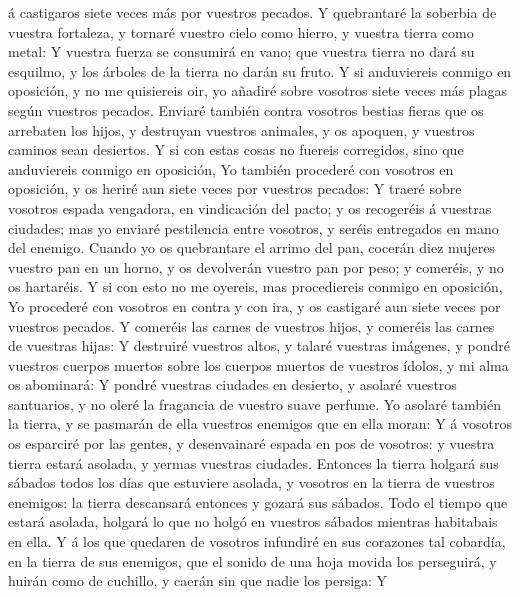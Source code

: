 á castigaros siete veces más por vuestros pecados.  Y
quebrantaré la soberbia de vuestra fortaleza, y tornaré vuestro cielo
como hierro, y vuestra tierra como metal:  Y vuestra fuerza
se consumirá en vano; que vuestra tierra no dará su esquilmo, y los
árboles de la tierra no darán su fruto.  Y si anduviereis
conmigo en oposición, y no me quisiereis oir, yo añadiré sobre vosotros
siete veces más plagas según vuestros pecados.  Enviaré
también contra vosotros bestias fieras que os arrebaten los hijos, y
destruyan vuestros animales, y os apoquen, y vuestros caminos sean
desiertos.  Y si con estas cosas no fuereis corregidos,
sino que anduviereis conmigo en oposición,  Yo también
procederé con vosotros en oposición, y os heriré aun siete veces por
vuestros pecados:  Y traeré sobre vosotros espada
vengadora, en vindicación del pacto; y os recogeréis á vuestras
ciudades; mas yo enviaré pestilencia entre vosotros, y seréis entregados
en mano del enemigo.  Cuando yo os quebrantare el arrimo
del pan, cocerán diez mujeres vuestro pan en un horno, y os devolverán
vuestro pan por peso; y comeréis, y no os hartaréis.  Y si
con esto no me oyereis, mas procediereis conmigo en oposición,
 Yo procederé con vosotros en contra y con ira, y os
castigaré aun siete veces por vuestros pecados.  Y comeréis
las carnes de vuestros hijos, y comeréis las carnes de vuestras hijas:
 Y destruiré vuestros altos, y talaré vuestras imágenes, y
pondré vuestros cuerpos muertos sobre los cuerpos muertos de vuestros
ídolos, y mi alma os abominará:  Y pondré vuestras ciudades
en desierto, y asolaré vuestros santuarios, y no oleré la fragancia de
vuestro suave perfume.  Yo asolaré también la tierra, y se
pasmarán de ella vuestros enemigos que en ella moran:  Y á
vosotros os esparciré por las gentes, y desenvainaré espada en pos de
vosotros: y vuestra tierra estará asolada, y yermas vuestras ciudades.
 Entonces la tierra holgará sus sábados todos los días que
estuviere asolada, y vosotros en la tierra de vuestros enemigos: la
tierra descansará entonces y gozará sus sábados.  Todo el
tiempo que estará asolada, holgará lo que no holgó en vuestros sábados
mientras habitabais en ella.  Y á los que quedaren de
vosotros infundiré en sus corazones tal cobardía, en la tierra de sus
enemigos, que el sonido de una hoja movida los perseguirá, y huirán como
de cuchillo, y caerán sin que nadie los persiga:  Y
